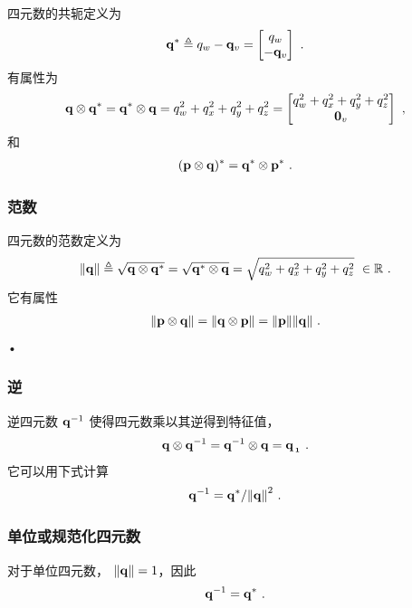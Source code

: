 四元数的共轭定义为
%
\begin{align}
{\bf q}^*\triangleq q_w-{\bf q}_v=\begin{bmatrix}
q_w \\ -{\bf q}_v
\end{bmatrix}
~.
\end{align}
%
有属性为
%
\begin{align}
{\bf q}\otimes{\bf q}^* = {\bf q}^*\otimes{\bf q} 
=q_w^2 +q_x^2 +q_y^2 +q_z^2
= \begin{bmatrix}
q_w^2 +q_x^2 +q_y^2 +q_z^2 \\ {\bf0}_v
\end{bmatrix}
~,
\end{align}
%
和
%
\begin{align}
({\bf p}\otimes{\bf q})^* = {\bf q}^*\otimes{\bf p}^* 
~.
\end{align}%


\subsubsection{范数}

四元数的范数定义为
%
\begin{align}\label{equ:q_norm}
{\left\|{\bf q}\right\|} \triangleq \sqrt{{\bf q}\otimes{\bf q}^*} = \sqrt{{\bf q}^*\otimes{\bf q}} = \sqrt{q_w^2 +q_x^2 +q_y^2 +q_z^2 } ~\in {\mathbb R} ~.
\end{align}
%
它有属性
%
\begin{align}
{\left\|{\bf p}\otimes{\bf q}\right\|} = {\left\|{\bf q}\otimes{\bf p}\right\|} = {\left\|{\bf p}\right\|}{\left\|{\bf q}\right\|}~. \label{equ:norm_prod}
\end{align}•

\subsubsection{逆}

逆四元数 ${\bf q}^{-1}$ 使得四元数乘以其逆得到特征值，
%
\begin{align}
{\bf q}\otimes{\bf q}^{-1} = {\bf q}^{-1}\otimes{\bf q} = {\bf q}_{{\,}_{\bf 1}}~.
\end{align}
%
它可以用下式计算
%
\begin{align}
{\bf q}^{-1} = {\bf q}^*/{\left\|{\bf q}\right\|}^2~.
\end{align}

\subsubsection{单位或规范化四元数}

对于单位四元数， ${\left\|{\bf q}\right\|}=1$，因此
%
\begin{align}
{\bf q}^{-1} = {\bf q}^*~.
\end{align}


